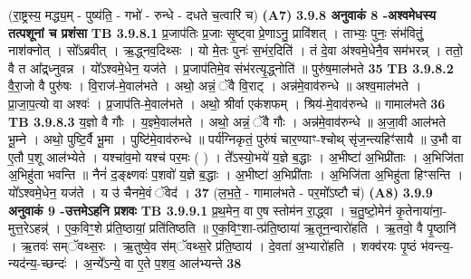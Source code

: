 \documentclass[17pt]{extarticle}
\begin{document}
{{{{{{{{{{{{{{{{{{{{{{                  \newline
                                    (रा॒ष्ट्रस्य॒ मद्ध्य॒म् - पुष्य॑ति॒ - गभो॑ - रुन्धे - दधते च॒त्वारि॑ च) \textbf{(A7)} \newline \newline
                \textbf{ 3.9.8     अनुवाकं   8 -अश्वमेधस्य तत्पशूनां च प्रशंसा} \newline
                                \textbf{ TB 3.9.8.1} \newline
                  प्र॒जाप॑तिः प्र॒जाः सृ॒ष्ट्वा प्रे॒णाऽनु॒ प्रावि॑शत् । ताभ्यः॒ पुनः॒ संभ॑वितुं॒ नाश॑क्नोत् । सो᳚ऽब्रवीत् । ऋ॒द्ध्नव॒दिथ्सः । यो मे॒तः पुनः॑ स॒भंर॒दिति॑ । तं दे॒वा अ॑श्वमे॒धेनै॒व सम॑भरन्न् । ततो॒ वै त आ᳚द्र्ध्नुवन्न । यो᳚ऽश्वमे॒धेन॒ यज॑ते । प्र॒जाप॑तिमे॒व संभ॑रत्यृ॒द्ध्नोति॑ ॥ पुरु॑ष॒माल॑भते \textbf{ 35} \newline
                  \newline
                                \textbf{ TB 3.9.8.2} \newline
                  वै॒रा॒जो वै पुरु॑षः । वि॒राज॑-मे॒वाल॑भते । अथो॒ अन्नं॒ ॅवै वि॒राट् । अन्न॑मे॒वाव॑रुन्धे ॥ अश्व॒माल॑भते । प्रा॒जा॒प॒त्यो वा अश्वः॑ । प्र॒जाप॑ति-मे॒वाल॑भते । अथो॒ श्रीर्वा एक॑शफम् । श्रिय॑-मे॒वाव॑रुन्धे ॥ गामाल॑भते \textbf{ 36} \newline
                  \newline
                                \textbf{ TB 3.9.8.3} \newline
                  य॒ज्ञो वै गौः । य॒ज्ञ्मे॒वाल॑भते । अथो॒ अन्नं॒ ॅवै गौः । अन्न॑मे॒वाव॑रुन्धे ॥ अ॒जा॒वी आल॑भते भू॒म्ने । अथो॒ पुष्टि॒र्वै भू॒मा । पुष्टि॑मे॒वाव॑रुन्धे ॥ पर्य॑ग्निकृतं॒ पुरु॑षं चार॒ण्याꣳ-श्चोथ् सृ॑ज॒न्त्यहिꣳ॑सायै ॥ उ॒भौ वा ए॒तौ प॒शू आल॑भ्येते । यश्चा॑व॒मो यश्च॑ पर॒मः ( ) । ते᳚ऽस्यो॒भये॑ य॒ज्ञे ब॒द्धाः । अ॒भीष्टा॑ अ॒भिप्री॑ताः । अ॒भिजि॑ता अ॒भिहु॑ता भवन्ति ॥ नैनं॑ द॒ङ्क्ष्णवः॑ प॒शवो॑ य॒ज्ञे ब॒द्धाः । अ॒भीष्टा॑ अ॒भिप्री॑ताः । अ॒भिजि॑ता अ॒भिहु॑ता हिꣳसन्ति । यो᳚ऽश्वमे॒धेन॒ यज॑ते । य उ॑ चैनमे॒वं ॅवेद॑ । \textbf{ 37} \newline
                  \newline
                                    (ल॒भ॒ते॒ - गामाल॑भते - पर॒मो᳚ऽष्टौ च॑) \textbf{(A8)} \newline \newline
                \textbf{ 3.9.9     अनुवाकं   9 -उत्तमेऽहनि प्रशवः} \newline
                                \textbf{ TB 3.9.9.1} \newline
                  प्र॒थ॒मेन॒ वा ए॒ष स्तोम॑न रा॒द्ध्वा । च॒तु॒ष्टो॒मेन॑ कृ॒तेनाया॑ना॒-मुत्त॒रेऽहन्न्॑ । ए॒क॒विꣳ॒॒शे प्र॑ति॒ष्ठायां॒ प्रति॑तिष्ठति ॥ ए॒क॒विꣳ॒॒शा-त्प्र॑ति॒ष्ठाया॑ ऋ॒तून॒न्वारो॑हति । ऋ॒तवो॒ वै पृ॒ष्ठानि॑ । ऋ॒तवः॑ सम्ॅवथ्स॒रः । ऋ॒तुष्वे॒व स॑म्ॅवथ्स॒रे प्र॑ति॒ष्ठाय॑ । दे॒वता॑ अ॒भ्यारो॑हति । शक्व॑रयः पृ॒ष्ठं भ॑वन्त्य॒-न्यद॑न्य॒-च्छन्दः॑ । अ॒न्ये᳚ऽन्ये॒ वा ए॒ते प॒शव॒ आल॑भ्यन्ते \textbf{ 38} \newline
}}}}}}}}}}}}}}}}}}}}}}
\end{document}
